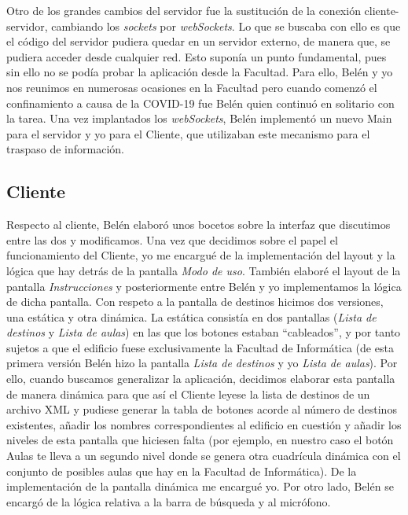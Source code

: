 Otro de los grandes cambios del servidor fue la sustitución de la conexión cliente-servidor, cambiando los \textit{sockets} por \textit{webSockets}. Lo que se buscaba con ello es que el código del servidor pudiera quedar en un servidor externo, de manera que, se pudiera acceder desde cualquier red. Esto suponía un punto fundamental, pues sin ello no se podía probar la aplicación desde la Facultad. Para ello, Belén y yo nos reunimos en numerosas ocasiones en la Facultad pero cuando comenzó el confinamiento a causa de la COVID-19 fue Belén quien continuó en solitario con la tarea. Una vez implantados los \textit{webSockets}, Belén implementó un nuevo Main para el servidor y yo para el Cliente, que utilizaban este mecanismo para el traspaso de información.

\subsection{Cliente}

Respecto al cliente, Belén elaboró unos bocetos sobre la interfaz que discutimos entre las dos y modificamos. Una vez que decidimos sobre el papel el funcionamiento del Cliente, yo me encargué de la implementación del layout y la lógica que hay detrás de la pantalla \textit{Modo de uso}. También elaboré el layout de la pantalla \textit{Instrucciones} y posteriormente entre Belén y yo implementamos la lógica de dicha pantalla. Con respeto a la pantalla de destinos hicimos dos versiones, una estática y otra dinámica. La estática consistía en dos pantallas (\textit{Lista de destinos} y \textit{Lista de aulas}) en las que los botones estaban ``cableados'', y por tanto sujetos a que el edificio fuese exclusivamente la Facultad de Informática (de esta primera versión Belén hizo la pantalla \textit{Lista de destinos} y yo \textit{Lista de aulas}). Por ello, cuando buscamos generalizar la aplicación, decidimos elaborar esta pantalla de manera dinámica para que así el Cliente leyese la lista de destinos de un archivo XML y pudiese generar la tabla de botones acorde al número de destinos existentes, añadir los nombres correspondientes al edificio en cuestión y añadir los niveles de esta pantalla que hiciesen falta (por ejemplo, en nuestro caso el botón Aulas te lleva a un segundo nivel donde se genera otra cuadrícula dinámica con el conjunto de posibles aulas que hay en la Facultad de Informática). De la implementación de la pantalla dinámica me encargué yo. Por otro lado, Belén se encargó de la lógica relativa a la barra de búsqueda y al micrófono. 


